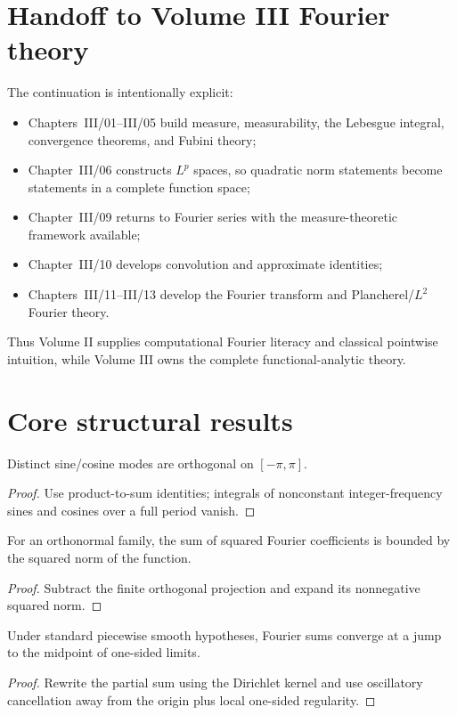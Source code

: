 \section{Handoff to Volume III Fourier theory}
The continuation is intentionally explicit:
\begin{itemize}
\item Chapters~III/01--III/05 build measure, measurability, the Lebesgue integral, convergence theorems, and Fubini theory;
\item Chapter~III/06 constructs $L^p$ spaces, so quadratic norm statements become statements in a complete function space;
\item Chapter~III/09 returns to Fourier series with the measure-theoretic framework available;
\item Chapter~III/10 develops convolution and approximate identities;
\item Chapters~III/11--III/13 develop the Fourier transform and Plancherel/$L^2$ Fourier theory.
\end{itemize}
Thus Volume II supplies computational Fourier literacy and classical pointwise intuition, while Volume III owns the complete functional-analytic theory.

\section{Core structural results}

\begin{theorem}\label{thm:ii14-01}
Distinct sine/cosine modes are orthogonal on $[-\pi,\pi]$.
\begin{proof}
Use product-to-sum identities; integrals of nonconstant integer-frequency sines and cosines over a full period vanish.
\end{proof}
\end{theorem}

\begin{theorem}\label{thm:ii14-02}
For an orthonormal family, the sum of squared Fourier coefficients is bounded by the squared norm of the function.
\begin{proof}
Subtract the finite orthogonal projection and expand its nonnegative squared norm.
\end{proof}
\end{theorem}

\begin{theorem}\label{thm:ii14-03}
Under standard piecewise smooth hypotheses, Fourier sums converge at a jump to the midpoint of one-sided limits.
\begin{proof}
Rewrite the partial sum using the Dirichlet kernel and use oscillatory cancellation away from the origin plus local one-sided regularity.
\end{proof}
\end{theorem}

